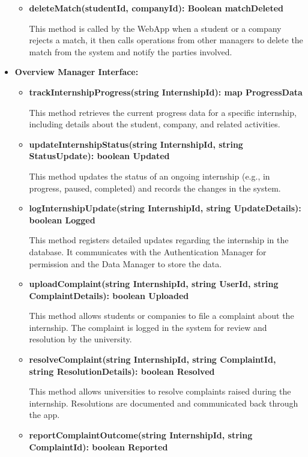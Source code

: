 \begin{itemize}
\begin{itemize}
    \item \textbf{deleteMatch(studentId, companyId): Boolean matchDeleted}

    This method is called by the WebApp when a student or a company rejects a match, it then calls operations from other managers to delete the match from the system and notify the parties involved.
\end{itemize}
\item \textbf{Overview Manager Interface:}
\begin{itemize}
    \item \textbf{trackInternshipProgress(string InternshipId): map ProgressData}

    This method retrieves the current progress data for a specific internship, including details about the student, company, and related activities.

    \item \textbf{updateInternshipStatus(string InternshipId, string StatusUpdate): boolean Updated}

    This method updates the status of an ongoing internship (e.g., in progress, paused, completed) and records the changes in the system.

    \item \textbf{logInternshipUpdate(string InternshipId, string UpdateDetails): boolean Logged}

    This method registers detailed updates regarding the internship in the database. It communicates with the Authentication Manager for permission and the Data Manager to store the data.

    \item \textbf{uploadComplaint(string InternshipId, string UserId, string ComplaintDetails): boolean Uploaded}

    This method allows students or companies to file a complaint about the internship. The complaint is logged in the system for review and resolution by the university.

    \item \textbf{resolveComplaint(string InternshipId, string ComplaintId, string ResolutionDetails): boolean Resolved}

    This method allows universities to resolve complaints raised during the internship. Resolutions are documented and communicated back through the app.

    \item \textbf{reportComplaintOutcome(string InternshipId, string ComplaintId): boolean Reported}


\end{itemize}
\end{itemize}
